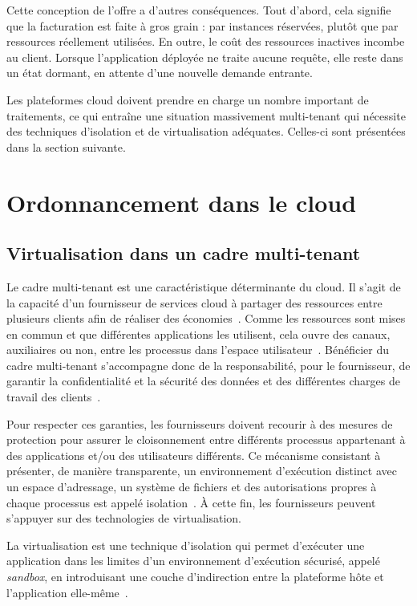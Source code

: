 Cette conception de l'offre a d'autres conséquences. Tout d'abord, cela signifie que la facturation est faite à gros grain : par instances réservées, plutôt que par ressources réellement utilisées. En outre, le coût des ressources inactives incombe au client. Lorsque l'application déployée ne traite aucune requête, elle reste dans un état dormant, en attente d'une nouvelle demande entrante.

Les plateformes cloud doivent prendre en charge un nombre important de traitements, ce qui entraîne une situation massivement multi-tenant qui nécessite des techniques d'isolation et de virtualisation adéquates. Celles-ci sont présentées dans la section suivante.

\section{Ordonnancement dans le cloud}

\subsection{Virtualisation dans un cadre multi-tenant}

Le cadre multi-tenant est une caractéristique déterminante du cloud. Il s'agit de la capacité d'un fournisseur de services cloud à partager des ressources entre plusieurs clients afin de réaliser des économies~\cite{weissmanDesignForceCom2009}. Comme les ressources sont mises en commun et que différentes applications les utilisent, cela ouvre des canaux, auxiliaires ou non, entre les processus dans l'espace utilisateur~\cite{pedersen2017trash, wu2018side}. Bénéficier du cadre multi-tenant s'accompagne donc de la responsabilité, pour le fournisseur, de garantir la confidentialité et la sécurité des données et des différentes charges de travail des clients~\cite{vaqueroLockingSkySurvey2011}.

Pour respecter ces garanties, les fournisseurs doivent recourir à des mesures de protection pour assurer le cloisonnement entre différents processus appartenant à des applications et/ou des utilisateurs différents. Ce mécanisme consistant à présenter, de manière transparente, un environnement d'exécution distinct avec un espace d'adressage, un système de fichiers et des autorisations propres à chaque processus est appelé isolation~\cite{fehlingCloudComputingPatterns2014}. À cette fin, les fournisseurs peuvent s'appuyer sur des technologies de virtualisation.

La virtualisation est une technique d'isolation qui permet d'exécuter une application dans les limites d'un environnement d'exécution sécurisé, appelé \textit{sandbox}, en introduisant une couche d'indirection entre la plateforme hôte et l'application elle-même~\cite{singhviAtollScalableLowLatency2021}.

